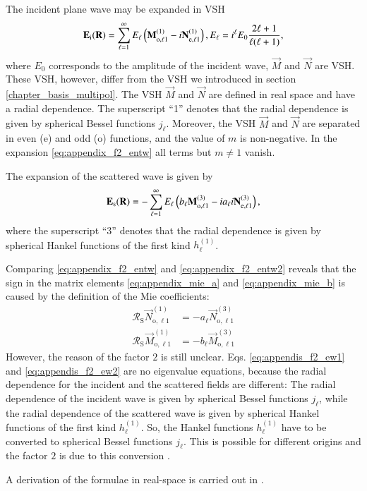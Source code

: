 The incident plane wave may be expanded in VSH
\begin{equation}
\label{eq:appendix_f2_entw}
{\mathbf{E}}_\text{i}({\mathbf{R}}) = \sum_{\ell=1}^\infty E_\ell \left({\mathbf{M}}_{\text{o}, \ell 1}^{(1)} - i {\mathbf{N}}_{\text{e}, \ell 1}^{(1)} \right), \\ E_\ell = i^\ell E_0 \frac{2\ell+1}{\ell(\ell+1)},
\end{equation}
where $E_0$ corresponds to the amplitude of the incident wave, $\vec M$
and $\vec N$ are VSH. These VSH, however, differ from the VSH we introduced
in section \ref{chapter_basis_multipol}. The VSH $\vec M$ and
$\vec N$ are defined in real space and have a radial dependence. The
superscript ``1'' denotes that the radial dependence is given by
spherical Bessel functions $j_\ell$. Moreover, the VSH $\vec M$ and $\vec N$
are separated in even (e) and odd (o) functions, and the value of $m$
is non-negative. In the expansion \eqref{eq:appendix_f2_entw} all terms
but $m \ne 1$ vanish.

The expansion of the scattered wave is given by
\begin{equation}
\label{eq:appendix_f2_entw2}
{\mathbf{E}}_\text{s}({\mathbf{R}}) = -\sum_{\ell=1}^\infty E_\ell \left(b_\ell {\mathbf{M}}_{\text{o}, \ell 1}^{(3)} - i a_\ell i {\mathbf{N}}_{\text{e}, \ell 1}^{(3)} \right),
\end{equation}
where the superscript ``3'' denotes that the radial dependence is given
by spherical Hankel functions of the first kind $h_\ell^{(1)}$.

Comparing \eqref{eq:appendix_f2_entw} and \eqref{eq:appendix_f2_entw2}
reveals that the sign in the matrix elements \eqref{eq:appendix_mie_a} and
\eqref{eq:appendix_mie_b} is caused by the definition of the Mie coefficients:
\begin{align}
\label{eq:appendis_f2_ew1}
\mathcal{R}_\text{S} \vec{N}_{\text{o},\ell 1}^{(1)} &= -a_\ell \vec{N}_{\text{o},\ell 1}^{(3)} \\
\label{eq:appendis_f2_ew2}
\mathcal{R}_\text{S} \vec{M}_{\text{o},\ell 1}^{(1)} &= -b_\ell \vec{M}_{\text{o},\ell 1}^{(3)}
\end{align}
However, the reason of the factor $2$ is still unclear. Eqs. 
\eqref{eq:appendis_f2_ew1} and \eqref{eq:appendis_f2_ew2} are no
eigenvalue equations, because the radial dependence for the incident
and the scattered fields are different: The radial dependence of the
incident wave is given by spherical Bessel functions $j_\ell$, while
the radial dependence of the scattered wave is given by spherical Hankel functions of the
first kind $h^{(1)}_\ell$. So, the Hankel functions
$h^{(1)}_\ell$ have to be converted to spherical Bessel functions $j_\ell$.
This is possible for different origins and the factor $2$ is due to this
conversion \cite{bostroem}. 

A derivation of the formulae in real-space is carried out in
\cite{PhysRevA.92.062504}.
